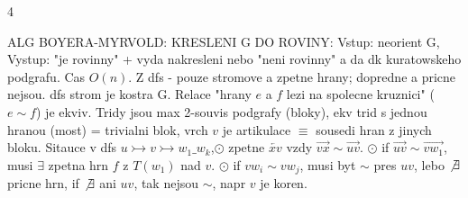 \documentclass[8pt]{extarticle}
\begin{document}
\fontsize{4.1pt}{4.8pt}\selectfont 

\begin{multicols*}{4} 


ALG BOYERA-MYRVOLD: KRESLENI G DO ROVINY: Vstup: neorient G, Vystup: "je rovinny" + vyda nakresleni nebo "neni rovinny" a da dk kuratowskeho podgrafu. Cas $O(n)$. Z dfs - pouze stromove a zpetne hrany; dopredne a pricne nejsou. dfs strom je kostra G. Relace "hrany $e$ a $f$ lezi na spolecne kruznici" ($e\sim f$) je ekviv. Tridy jsou max 2-souvis podgrafy (bloky), ekv trid s jednou hranou (most) = trivialni blok, vrch $v$ je artikulace $\equiv$ sousedi hran z jinych bloku. Sitauce v dfs $u\rightarrowtail v\rightarrowtail w_1\_w_k$,$\odot$ zpetne $\overleftarrow{xv}$ vzdy $\overrightarrow{vx}\sim \overrightarrow{uv}$. $\odot$ if $\overrightarrow{uv} \sim \overrightarrow{vw_1}$, musi $\exists$ zpetna hrn $f$ z $T(w_1)$ nad $v$. $\odot$ if $vw_i\sim vw_j$, musi byt $\sim$ pres $uv$, lebo $\not\exists$ pricne hrn, if $\not\exists$ ani $uv$, tak nejsou $\sim$, napr $v$ je koren. 

\end{multicols*}
\end{document}
